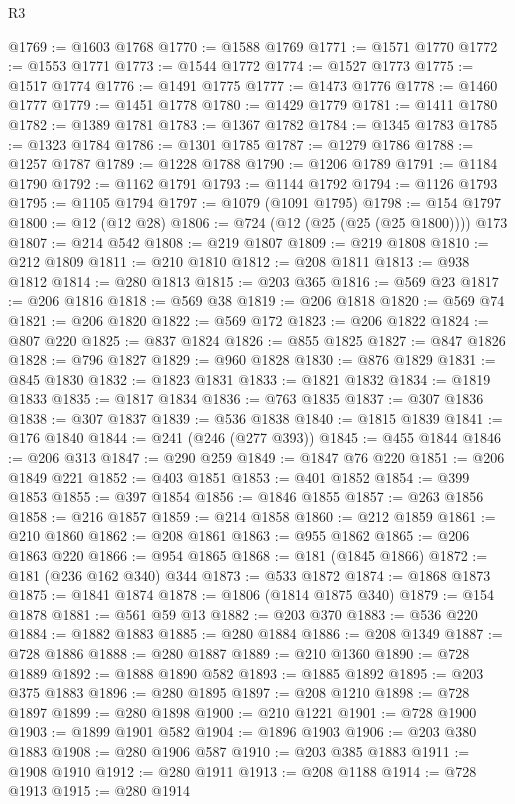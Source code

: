 \begin{lexlean}{R3}
\begin{coremodule}
@1769 := @1603 @1768
@1770 := @1588 @1769
@1771 := @1571 @1770
@1772 := @1553 @1771
@1773 := @1544 @1772
@1774 := @1527 @1773
@1775 := @1517 @1774
@1776 := @1491 @1775
@1777 := @1473 @1776
@1778 := @1460 @1777
@1779 := @1451 @1778
@1780 := @1429 @1779
@1781 := @1411 @1780
@1782 := @1389 @1781
@1783 := @1367 @1782
@1784 := @1345 @1783
@1785 := @1323 @1784
@1786 := @1301 @1785
@1787 := @1279 @1786
@1788 := @1257 @1787
@1789 := @1228 @1788
@1790 := @1206 @1789
@1791 := @1184 @1790
@1792 := @1162 @1791
@1793 := @1144 @1792
@1794 := @1126 @1793
@1795 := @1105 @1794
@1797 := @1079 (@1091 @1795)
@1798 := @154 @1797
@1800 := @12 (@12 @28)
@1806 := @724 (@12 (@25 (@25 (@25 @1800)))) @173
@1807 := @214 @542
@1808 := @219 @1807
@1809 := @219 @1808
@1810 := @212 @1809
@1811 := @210 @1810
@1812 := @208 @1811
@1813 := @938 @1812
@1814 := @280 @1813
@1815 := @203 @365
@1816 := @569 @23
@1817 := @206 @1816
@1818 := @569 @38
@1819 := @206 @1818
@1820 := @569 @74
@1821 := @206 @1820
@1822 := @569 @172
@1823 := @206 @1822
@1824 := @807 @220
@1825 := @837 @1824
@1826 := @855 @1825
@1827 := @847 @1826
@1828 := @796 @1827
@1829 := @960 @1828
@1830 := @876 @1829
@1831 := @845 @1830
@1832 := @1823 @1831
@1833 := @1821 @1832
@1834 := @1819 @1833
@1835 := @1817 @1834
@1836 := @763 @1835
@1837 := @307 @1836
@1838 := @307 @1837
@1839 := @536 @1838
@1840 := @1815 @1839
@1841 := @176 @1840
@1844 := @241 (@246 (@277 @393))
@1845 := @455 @1844
@1846 := @206 @313
@1847 := @290 @259
@1849 := @1847 @76 @220
@1851 := @206 @1849 @221
@1852 := @403 @1851
@1853 := @401 @1852
@1854 := @399 @1853
@1855 := @397 @1854
@1856 := @1846 @1855
@1857 := @263 @1856
@1858 := @216 @1857
@1859 := @214 @1858
@1860 := @212 @1859
@1861 := @210 @1860
@1862 := @208 @1861
@1863 := @955 @1862
@1865 := @206 @1863 @220
@1866 := @954 @1865
@1868 := @181 (@1845 @1866)
@1872 := @181 (@236 @162 @340) @344
@1873 := @533 @1872
@1874 := @1868 @1873
@1875 := @1841 @1874
@1878 := @1806 (@1814 @1875 @340)
@1879 := @154 @1878
@1881 := @561 @59 @13
@1882 := @203 @370
@1883 := @536 @220
@1884 := @1882 @1883
@1885 := @280 @1884
@1886 := @208 @1349
@1887 := @728 @1886
@1888 := @280 @1887
@1889 := @210 @1360
@1890 := @728 @1889
@1892 := @1888 @1890 @582
@1893 := @1885 @1892
@1895 := @203 @375 @1883
@1896 := @280 @1895
@1897 := @208 @1210
@1898 := @728 @1897
@1899 := @280 @1898
@1900 := @210 @1221
@1901 := @728 @1900
@1903 := @1899 @1901 @582
@1904 := @1896 @1903
@1906 := @203 @380 @1883
@1908 := @280 @1906 @587
@1910 := @203 @385 @1883
@1911 := @1908 @1910
@1912 := @280 @1911
@1913 := @208 @1188
@1914 := @728 @1913
@1915 := @280 @1914

\end{coremodule}
\end{lexlean}
